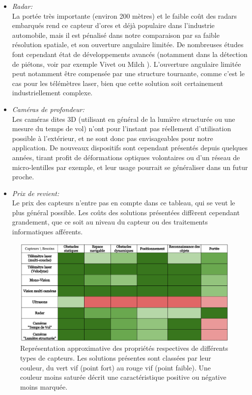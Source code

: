\begin{itemize}
\item{\emph{Radar:\\}}
La portée très importante (environ 200 mètres) et le faible coût des radars embarqués rend ce capteur d'ores et déjà populaire dans l'industrie automobile, mais il est pénalisé dans notre comparaison par sa faible résolution spatiale, et son ouverture angulaire limitée. De nombreuses études font cependant état de développements avancés (notamment dans la détection de piétons, voir par exemple Vivet \cite{Vivet, Vivet2013} ou Milch \cite{Milch2001}). L'ouverture angulaire limitée peut notamment être compensée par une structure tournante, comme c'est le cas pour les télémètres laser, bien que cette solution soit certainement industriellement complexe.\\

\item{\emph{Caméras de profondeur:\\}}
Les caméras dites \og 3D\fg{} (utilisant en général de la lumière structurée ou une mesure du temps de vol) n'ont pour l'instant pas réellement d'utilisation possible à l'extérieur, et ne sont donc pas envisageables pour notre application. De nouveaux dispositifs sont cependant présentés depuis quelques années, tirant profit de déformations optiques volontaires ou d'un réseau de micro-lentilles par exemple, et leur usage pourrait se généraliser dans un futur proche.\\

\item{\emph{Prix de revient:\\}}
Le prix des capteurs n'entre pas en compte dans ce tableau, qui se veut le plus général possible. Les coûts des solutions présentées diffèrent cependant grandement, que ce soit au niveau du capteur ou des traitements informatiques afférents.\\
\end{itemize}

\begin{figure} 
	\centerline{
		\includegraphics[width=1\textwidth]{Chapter2/graphics/sensor_needs.png}
		}
	\caption{Représentation approximative des propriétés respectives de différents types de capteurs. Les solutions présentes sont classées par leur couleur, du vert vif (point fort) au rouge vif (point faible). Une couleur moins saturée décrit une caractéristique positive ou négative moins marquée.}
	\label{tab:ch2_Comparaison_capteurs}
\end{figure}

